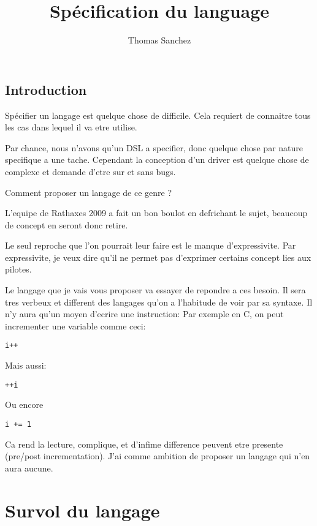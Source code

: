 \documentclass{rtxreport}
\author{Thomas Sanchez}
\title{Spécification du language}
\begin{document}
\maketitle

\rtxmaketitleblock

\tableofcontents

\abstract{}

\lstset{language=rathaxes}
\section{Introduction}

Spécifier un langage est quelque chose de difficile. Cela requiert de connaitre
tous les cas dans lequel il va etre utilise.

Par chance, nous n'avons qu'un DSL a specifier, donc quelque chose par nature
specifique a une tache. Cependant la conception d'un driver est quelque chose
de complexe et demande d'etre sur et sans bugs.

Comment proposer un langage de ce genre ?

L'equipe de Rathaxes 2009 a fait un bon boulot en defrichant le sujet, beaucoup
de concept en seront donc retire.

Le seul reproche que l'on pourrait leur faire est le manque d'expressivite.
Par expressivite, je veux dire qu'il ne permet pas d'exprimer certains concept
lies aux pilotes.

Le langage que je vais vous proposer va essayer de repondre a ces besoin. Il
sera tres verbeux et different des langages qu'on a l'habitude de voir par
sa syntaxe. Il n'y aura qu'un moyen d'ecrire une instruction:
Par exemple en C, on peut incrementer une variable comme ceci:
\begin{lstlisting}
i++
\end{lstlisting}
Mais aussi:
\begin{lstlisting}
++i
\end{lstlisting}
Ou encore
\begin{lstlisting}
i += 1
\end{lstlisting}

Ca rend la lecture, complique, et d'infime difference peuvent etre presente (pre/post incrementation).
J'ai comme ambition de proposer un langage qui n'en aura aucune.

\chapter{Survol du langage}
\end{document}
